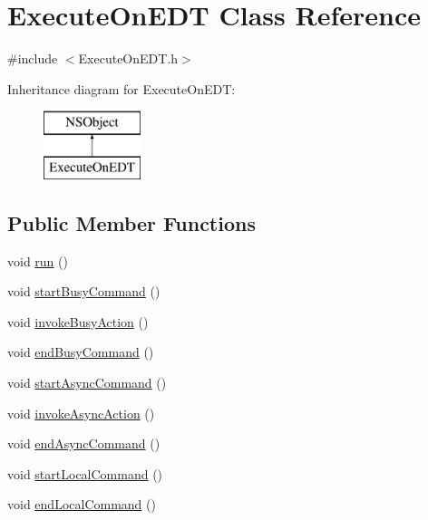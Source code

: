 \hypertarget{interface_execute_on_e_d_t}{
\section{\-Execute\-On\-E\-D\-T \-Class \-Reference}
\label{interface_execute_on_e_d_t}
}


{\ttfamily \#include $<$\-Execute\-On\-E\-D\-T.\-h$>$}

\-Inheritance diagram for \-Execute\-On\-E\-D\-T\-:\begin{figure}[H]
\begin{center}
\leavevmode
\includegraphics[height=2.000000cm]{interface_execute_on_e_d_t}
\end{center}
\end{figure}
\subsection*{\-Public \-Member \-Functions}
\begin{DoxyCompactItemize}
\item 
void \hyperlink{interface_execute_on_e_d_t_aad2e6fcad7dbaafada1ac066303aed50}{run} ()
\item 
void \hyperlink{interface_execute_on_e_d_t_aac301baf44c46b2268ae1e377209103e}{start\-Busy\-Command} ()
\item 
void \hyperlink{interface_execute_on_e_d_t_aefc632dcd000e4905cb57598c73c541a}{invoke\-Busy\-Action} ()
\item 
void \hyperlink{interface_execute_on_e_d_t_a7c69e63a62d0c71d5384c36b3c628390}{end\-Busy\-Command} ()
\item 
void \hyperlink{interface_execute_on_e_d_t_a278bf85f95f70581a07b988e7c3f0174}{start\-Async\-Command} ()
\item 
void \hyperlink{interface_execute_on_e_d_t_a64e6b836ea524c4ef4d09394c961aae7}{invoke\-Async\-Action} ()
\item 
void \hyperlink{interface_execute_on_e_d_t_a6084a089ef8b1bf9e19c864db5475ff7}{end\-Async\-Command} ()
\item 
void \hyperlink{interface_execute_on_e_d_t_ad94b286ca3c87801bc4067fb223922a8}{start\-Local\-Command} ()
\item 
void \hyperlink{interface_execute_on_e_d_t_af0114a3d35985fd313736a2fee9bcd6d}{end\-Local\-Command} ()
\end{DoxyCompactItemize}
